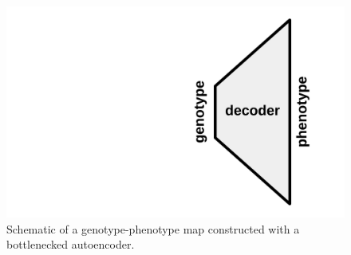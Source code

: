 \begin{figure}
  \includegraphics[width=\linewidth]{img/bottleneck_map}
  \caption{
    Schematic of a genotype-phenotype map constructed with a bottlenecked autoencoder.
  }\label{fig:bottleneck_map}
\end{figure}

